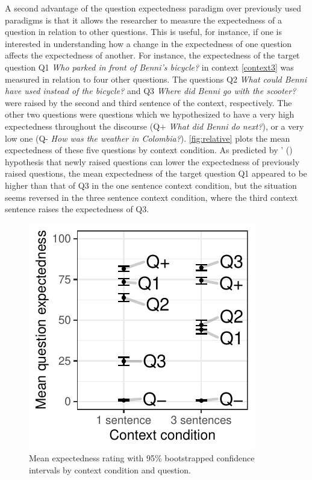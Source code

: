 \documentclass{salt}
\begin{document}
A second advantage of the question expectedness paradigm over previously used paradigms is that it allows the researcher to measure the expectedness of a question in relation to other questions. This is useful, for instance, if one is interested in understanding how a change in the expectedness of one question affects the expectedness of another. For instance, the expectedness of the target question Q1 \textit{Who parked in front of Benni's bicycle?} in context \ref{context3} was measured in relation to four other questions. The questions Q2 \textit{What could Benni have used instead of the bicycle?} and Q3 \textit{Where did Benni go with the scooter?} were raised by the second and third sentence of the context, respectively. The other two questions were questions which we hypothesized to have a very high expectedness throughout the discourse (Q+ \textit{What did Benni do next?}), or a very low one (Q- \textit{How was the weather in Colombia?}). \autoref{fig:relative} plots the mean expectedness of these five questions by context condition. As predicted by \citeauthor{tonnis_2021}' (\citeyear[273ff.]{tonnis_2021}) hypothesis that newly raised questions can lower the expectedness of previously raised questions, the mean expectedness of the target question Q1 appeared to be higher than that of Q3 in the one sentence context condition, but the situation seems reversed in the three sentence context condition, where the third context sentence raises the expectedness of Q3. 

\begin{figure}[]
\caption{Mean expectedness rating with 95\% bootstrapped confidence intervals by context condition and question.}
\begin{center}
\includegraphics[width=.5\textwidth]{main_results_norming.pdf}
\end{center}
\label{fig:relative}
\end{figure}
\end{document}
